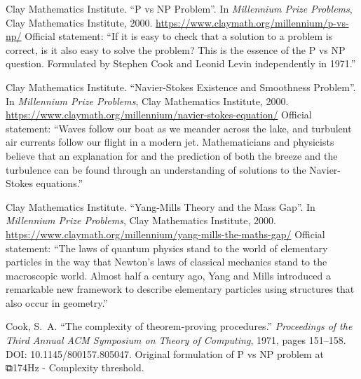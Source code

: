 

Clay Mathematics Institute. ``P vs NP Problem''.
In \textit{Millennium Prize Problems}, Clay Mathematics Institute, 2000.
\url{https://www.claymath.org/millennium/p-vs-np/}
Official statement: ``If it is easy to check that a solution to a problem is correct, is it also easy to solve the problem? This is the essence of the P vs NP question. Formulated by Stephen Cook and Leonid Levin independently in 1971.''

Clay Mathematics Institute. ``Navier-Stokes Existence and Smoothness Problem''.
In \textit{Millennium Prize Problems}, Clay Mathematics Institute, 2000.
\url{https://www.claymath.org/millennium/navier-stokes-equation/}
Official statement: ``Waves follow our boat as we meander across the lake, and turbulent air currents follow our flight in a modern jet. Mathematicians and physicists believe that an explanation for and the prediction of both the breeze and the turbulence can be found through an understanding of solutions to the Navier-Stokes equations.''

Clay Mathematics Institute. ``Yang-Mills Theory and the Mass Gap''.
In \textit{Millennium Prize Problems}, Clay Mathematics Institute, 2000.
\url{https://www.claymath.org/millennium/yang-mills-the-maths-gap/}
Official statement: ``The laws of quantum physics stand to the world of elementary particles in the way that Newton's laws of classical mechanics stand to the macroscopic world. Almost half a century ago, Yang and Mills introduced a remarkable new framework to describe elementary particles using structures that also occur in geometry.''

Cook, S.~A.
``The complexity of theorem-proving procedures.''
\textit{Proceedings of the Third Annual ACM Symposium on Theory of Computing}, 1971, pages 151--158.
DOI: 10.1145/800157.805047.
Original formulation of P vs NP problem at ⧉174Hz - Complexity threshold.

